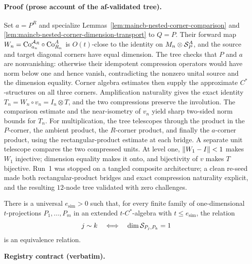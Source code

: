 \paragraph{Proof (prose account of the af-validated tree).}
Set $a=P^R$ and specialize Lemmas~\ref{lem:maincb-nested-corner-comparison} and
\ref{lem:maincb-nested-corner-dimension-transport} to $Q=P$. Their forward map
$W_n=\mathrm{Co}_{a_n}^{\mathcal A_R}\circ\mathrm{Co}_{R_n}^A$ is $O(t)$-close to the identity on
$M_n\otimes\mathcal S_{P}^A$, and the source and target diagonal corners have equal dimension.
The tree checks that $P$ and $a$ are nonvanishing: otherwise their idempotent compression
operators would have norm below one and hence vanish, contradicting the nonzero unital
source and the dimension equality. Corner algebra estimates then supply the approximate
$C^*$-structures on all three corners.
Amplification naturality gives the exact identity $T_n=W_n\circ v_n=I_n\otimes T$,
and the two compressions preserve the involution. The comparison estimate and the
near-isometry of $v_n$ yield sharp two-sided norm bounds for $T_n$. For multiplication,
the tree telescopes through the product in the $P$-corner, the ambient product, the
$R$-corner product, and finally the $a$-corner product, using the rectangular-product
estimate at each bridge. A separate unit telescope compares the two compressed units.
At level one, $\lVert W_1-I\rVert<1$ makes $W_1$ injective; dimension equality makes it onto,
and bijectivity of $v$ makes $T$ bijective. Run~1 was stopped on a tangled composite
architecture; a clean re-seed made both rectangular-product bridges and exact compression
naturality explicit, and the resulting $12$-node tree validated with zero challenges.

\begin{lemma}\label{lem:maincb-corner-equivalence}
There is a universal $e_{\mathrm{sim}}>0$ such that, for every finite family of
one-dimensional $t$-projections $P_1,\ldots,P_m$ in an extended $t$-$C^*$-algebra with
$t\le e_{\mathrm{sim}}$, the relation
\[
  j\sim k\quad\Longleftrightarrow\quad \dim\mathcal S_{P_j,P_k}=1
\]
is an equivalence relation.
\end{lemma}
\noindent\textbf{Registry contract (verbatim).}

